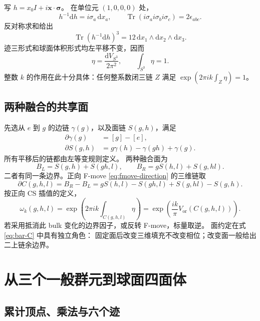 \documentclass[UTF8,11pt,fontset=none]{ctexart}
\numberwithin{equation}{section}
\theoremstyle{definition}
\DeclareMathOperator{\Tr}{Tr}
\newcommand{\dd}{\mathrm d}
\newcommand{\Id}{I}
\newcommand{\Vor}{V_{\mathrm{or}}}
\begin{document}
写 $h=x_0\Id+i\boldsymbol{x}\cdot\boldsymbol{\sigma}$。
在单位元 $(1,0,0,0)$ 处，
\[
 h^{-1}\dd h=i\sigma_a\,\dd x_a,\qquad
 \Tr(i\sigma_a i\sigma_b i\sigma_c)=2\epsilon_{abc}.
\]
反对称求和给出
\[
 \Tr(h^{-1}\dd h)^3=12\,\dd x_1\wedge\dd x_2\wedge\dd x_3.
\]
迹三形式和球面体积形式均左平移不变，因而
\begin{equation}
 \eta=\frac{\dd V_{S^3}}{2\pi^2},
 \qquad \int_{S^3}\eta=1.
 \label{eq:eta-normalized}
\end{equation}
整数 $k$ 的作用在此十分具体：任何整系数闭三链 $Z$ 满足
$\exp(2\pi ik\int_Z\eta)=1$。

\subsection{两种融合的共享面}

先选从 $e$ 到 $g$ 的边链 $\gamma(g)$，以及面链 $S(g,h)$，满足
\begin{align}
 \partial\gamma(g)&=[g]-[e],\\
 \partial S(g,h)&=g\gamma(h)-\gamma(gh)+\gamma(g).
 \label{eq:bar-face}
\end{align}
所有平移后的链都由左等变规则定义。
两种融合面为
\begin{equation}
 B_L=S(g,h)+S(gh,l),\qquad
 B_R=gS(h,l)+S(g,hl).
 \label{eq:BLBR}
\end{equation}
二者有同一条边界。正向 F-move \eqref{eq:fmove-direction} 的三维链取
\begin{equation}
 \partial C(g,h,l)=B_R-B_L
 =gS(h,l)-S(gh,l)+S(g,hl)-S(g,h).
 \label{eq:bar-C}
\end{equation}
按正向 CS 插值的定义，
\begin{equation}
 \boxed{\;
 \omega_k(g,h,l)=\exp\left(2\pi ik\int_{C(g,h,l)}\eta\right)
 =\exp\left(\frac{ik}{\pi}\Vor(C(g,h,l))\right).
 \;}
 \label{eq:geometric-phase}
\end{equation}
若采用抵消此 bulk 变化的边界因子，或反转 F-move，标量取逆。
面约定在式 \eqref{eq:bar-C} 中具有独立角色：
固定面后改变三维填充不改变相位；改变面一般给出二上链余边界。

\section{从三个一般群元到球面四面体}\label{sec:geometry}

\subsection{累计顶点、乘法与六个迹}
\end{document}
